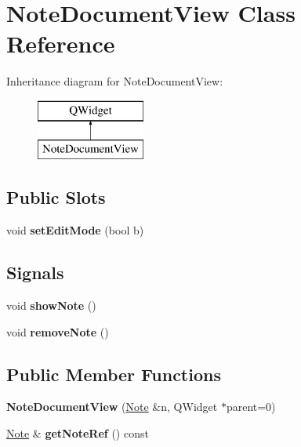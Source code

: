 \hypertarget{class_note_document_view}{\section{Note\-Document\-View Class Reference}
\label{class_note_document_view}
}
Inheritance diagram for Note\-Document\-View\-:\begin{figure}[H]
\begin{center}
\leavevmode
\includegraphics[height=2.000000cm]{class_note_document_view}
\end{center}
\end{figure}
\subsection*{Public Slots}
\begin{DoxyCompactItemize}
\item 
\hypertarget{class_note_document_view_a637a7ff39418eac09b46a127899c2c22}{void {\bfseries set\-Edit\-Mode} (bool b)}\label{class_note_document_view_a637a7ff39418eac09b46a127899c2c22}

\end{DoxyCompactItemize}
\subsection*{Signals}
\begin{DoxyCompactItemize}
\item 
\hypertarget{class_note_document_view_aebe3c11e6e84959c0230a46742ed24cc}{void {\bfseries show\-Note} ()}\label{class_note_document_view_aebe3c11e6e84959c0230a46742ed24cc}

\item 
\hypertarget{class_note_document_view_a88031846d72ed4c8a2231f97330add95}{void {\bfseries remove\-Note} ()}\label{class_note_document_view_a88031846d72ed4c8a2231f97330add95}

\end{DoxyCompactItemize}
\subsection*{Public Member Functions}
\begin{DoxyCompactItemize}
\item 
\hypertarget{class_note_document_view_a23c4801b97d936995c0f990859f0d313}{{\bfseries Note\-Document\-View} (\hyperlink{class_note}{Note} \&n, Q\-Widget $\ast$parent=0)}\label{class_note_document_view_a23c4801b97d936995c0f990859f0d313}

\item 
\hypertarget{class_note_document_view_a54947f363d357ff89f047a959b7c85ad}{\hyperlink{class_note}{Note} \& {\bfseries get\-Note\-Ref} () const }\label{class_note_document_view_a54947f363d357ff89f047a959b7c85ad}

\end{DoxyCompactItemize}



